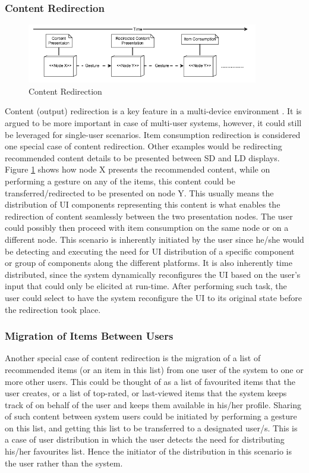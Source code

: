 \subsubsection{Content Redirection}
\begin{figure}[!htpb]
\includegraphics[width=0.9\textwidth, center, center]{figures/generic5}
\caption{Content Redirection}
\label{fig:figure35}
\end{figure}
Content (output) redirection is a key feature in a multi-device environment
\cite{elmqvist2011distributed}.
It is argued to be more important in case of multi-user systems, however, it could still be leveraged for single-user scenarios. Item consumption redirection is considered one special case of content redirection. Other examples would be redirecting recommended content details to be presented between SD and LD displays. Figure \ref{fig:figure35} shows how node X presents the recommended content, while on performing a gesture on any of the items, this content could be transferred/redirected to be presented on node Y. This usually means the distribution of UI components representing this content is what enables the redirection of content seamlessly between the two presentation nodes. The user could possibly then proceed with item consumption on the same node or on a different node.
This scenario is inherently initiated by the user since he/she would be detecting and executing the need for UI distribution of a specific component or group of components along the different platforms. It is also inherently time distributed, since the system dynamically reconfigures the UI based on the user's input that could only be elicited at run-time. After performing such task, the user could select to have the system reconfigure the UI to its original state before the redirection took place.

\subsubsection{Migration of Items Between Users}
Another special case of content redirection is the migration of a list of
recommended items (or an item in this list) from one user of the system to one
or more other users. This could be thought of as a list of favourited items that
the user creates, or a list of top-rated, or last-viewed items that the system keeps track of on behalf of the user and keeps them available in his/her profile. Sharing of such content between system users could be initiated by performing a gesture on this list, and getting this list to be transferred to a designated user/s. This is a case of user distribution in which the user detects the need for distributing his/her favourites list. Hence the initiator of the distribution in this scenario is the user rather than the system.
 
